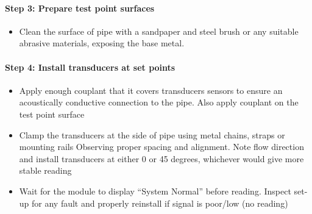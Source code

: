 \paragraph{Step 3: Prepare test point surfaces}
\begin{itemize}
	\item Clean the surface of pipe with a sandpaper and steel brush or any suitable abrasive materials, exposing the base metal.
	
\end{itemize}

\paragraph{Step 4: Install transducers at set points}
\begin{itemize}
	\item Apply enough couplant that it covers transducers sensors to ensure an acoustically conductive connection to the pipe. Also apply couplant on the test point surface %
	\item Clamp the transducers at the side of pipe using metal chains, straps or mounting rails Observing proper spacing and alignment. Note flow direction and install transducers at either 0 or 45 degrees, whichever would give more stable reading %
	\item Wait for the module to display “System Normal” before reading. Inspect set-up for any fault and properly reinstall if signal is poor/low (no reading)
\end{itemize}




